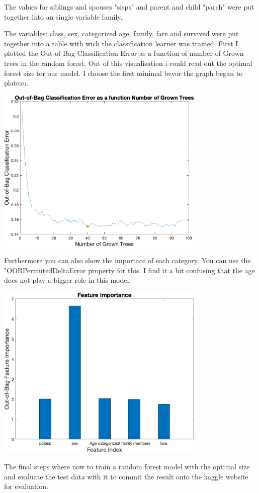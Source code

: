 \documentclass[
   10.5pt,
   invert-title=true,
   titlepage=false,
   titleimage-ratio=13,
   class=article
]{bfhpub}				%
\begin{document}
The values for siblings and spouses "sisps" and parent and child "parch" were put together into an single variable family. \newline

The variables: class, sex, categorized age, family, fare and survived were put together into a table with wich the classification learner was trained.
First I plotted the Out-of-Bag Classification Error as a function of number of Grown trees in the random forest. Out of this visualisation i could read out the optimal forest size for our model. I choose the first minimal bevor the graph began to plateau.
\begin{center}
	\includegraphics[width=100mm]{oob_error_plot_size40}
\end{center}
Furthermore you can also show the importace of each category. You can use the "OOBPermutedDeltaError property for this. I find it a bit confusing that the age does not play a bigger role in this model.
\begin{center}
	\includegraphics[width=100mm]{feature_importance_plot_size40}
\end{center}
The final steps where now to train a random forest model with the optimal size and evaluate the test data with it to commit the result onto the kaggle website for evaluation.
\end{document}
